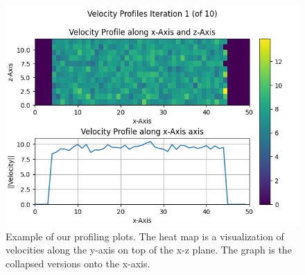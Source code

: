 \documentclass{article}
\begin{document}
    \begin{figure}[H]
        \centering
        \includegraphics[width=1\textwidth]{../../res/Profile_example.png}
        \caption{Example of our profiling plots. The heat map is a visualization of velocities along the y-axis on top of the x-z plane. The graph is the collapsed versions onto the x-axis. }
        \label{fig:plot_xmpl}
    \end{figure}
\end{document}

